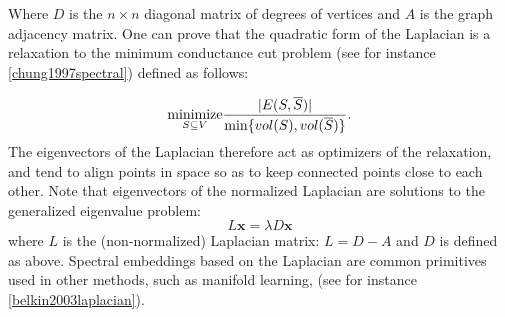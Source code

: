 Where $D$ is the $n \times n$ diagonal matrix of degrees of vertices and $A$ is the graph adjacency matrix. One can prove that the quadratic form of the Laplacian is a relaxation to the minimum conductance cut problem (see for instance \ref{chung1997spectral}) defined as follows:

\[
    \underset{S  \subseteq V }{\text{minimize}} {|E(S,\overline{S})|\over \min\{vol(S), vol(\overline{S})\}}.
\]
The eigenvectors of the Laplacian therefore act as optimizers of the relaxation, and tend to align points in space so as to keep connected points close to each other. Note that eigenvectors of the normalized Laplacian are solutions to the generalized eigenvalue problem:
\[
    L\mathbf{x} = \lambda D\mathbf{x}
\]
where $L$ is the (non-normalized) Laplacian matrix: $L = D-A$ and $D$ is defined as above. Spectral embeddings based on the Laplacian are common primitives used in other methods, such as manifold learning, (see for instance \ref{belkin2003laplacian}).

\iffalse
\subsubsection*{Isomap}
Isomap is a method for manifold learning / non-linear dimensionality reduction. In a general setting, given data points living in a (non-linear) manifold in $\mathbb{R}^n$ we would like to embed them into lower dimensional space while preserving geodesic distances.
\fi
